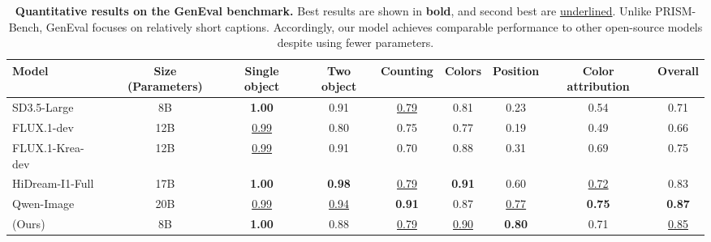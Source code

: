 \begin{table}
\setlength{\tabcolsep}{3pt}
  \centering
  \begin{adjustbox}{width=\textwidth}
  \begin{tabular}{lcccccccc}
    \toprule
    \textbf{Model} & \textbf{Size (Parameters)} & \textbf{Single object} & \textbf{Two object} & \textbf{Counting} & \textbf{Colors} & \textbf{Position} & \textbf{Color attribution} & \textbf{Overall} \\    
    \midrule
    SD3.5-Large~\citep{SD35} & 8B & \textbf{1.00} & 0.91 & \underline{0.79} & 0.81 & 0.23 & 0.54 & 0.71 \\
    FLUX.1-dev~\citep{flux2024} & 12B & \underline{0.99} & 0.80 & 0.75 & 0.77 & 0.19 & 0.49 & 0.66 \\
    FLUX.1-Krea-dev~\citep{fluxkrea} & 12B & \underline{0.99} & 0.91 & 0.70 & 0.88 & 0.31 & 0.69 & 0.75 \\
    HiDream-I1-Full~\citep{cai2025hidream} & 17B & \textbf{1.00} & \textbf{0.98} & \underline{0.79} & \textbf{0.91} & 0.60 & \underline{0.72} & 0.83 \\
    Qwen-Image~\citep{wu2025qwenimagetechnicalreport} & 20B & \underline{0.99} & \underline{0.94} & \textbf{0.91} & 0.87 & \underline{0.77} & \textbf{0.75} & \textbf{0.87} \\
    \midrule
    \modelname{} (Ours) & 8B & \textbf{1.00} & 0.88 & \underline{0.79} & \underline{0.90} & \textbf{0.80} & 0.71 & \underline{0.85} \\
    \bottomrule
  \end{tabular}
  \end{adjustbox}
\caption{\textbf{Quantitative results on the GenEval benchmark.} Best results are shown in \textbf{bold}, and second best are \underline{underlined}. Unlike PRISM-Bench, GenEval focuses on relatively short captions. Accordingly, our model \modelname{} achieves comparable performance to other open-source models despite using fewer parameters.}


  \label{tab:geneval}
\end{table}